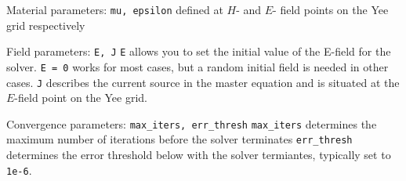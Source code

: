 \documentclass[landscape]{foils}
\begin{document}
\newpage
\I  Material parameters: \verb+mu, epsilon+
    \BIT
    \I  defined at $H$- and $E$- field points on the Yee grid respectively
    \EIT

\I  Field parameters: \verb+E, J+
    \BIT
    \I  \verb+E+ allows you to set the initial value of the E-field for the solver.
    \I  \verb+E = 0+ works for most cases, but a random initial field is needed
        in other cases.
    \I  \verb+J+ describes the current source in the master equation and is situated
        at the $E$-field point on the Yee grid.
    \EIT

\I  Convergence parameters: \verb+max_iters, err_thresh+
    \BIT
    \I  \verb+max_iters+ determines the maximum number of iterations before the solver terminates
    \I  \verb+err_thresh+ determines the error threshold below with the solver termiantes,
        typically set to \verb+1e-6+.
    \EIT
\EIT
\end{document}
